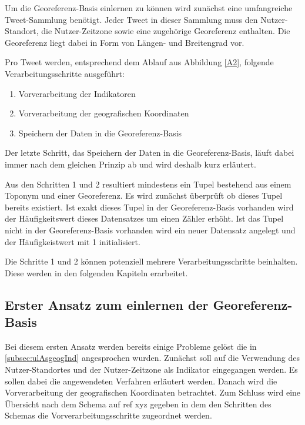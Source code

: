 						Um die Georeferenz-Basis einlernen zu können wird zunächst eine umfangreiche Tweet-Sammlung benötigt.
						Jeder Tweet in dieser Sammlung muss den Nutzer-Standort, die Nutzer-Zeitzone sowie eine zugehörige Georeferenz enthalten.
						Die Georeferenz liegt dabei in Form von Längen- und Breitengrad vor. 
						
						Pro Tweet werden, entsprechend dem Ablauf aus Abbildung \ref{A2}, folgende Verarbeitungsschritte ausgeführt:

						\begin{enumerate}
							\item Vorverarbeitung der Indikatoren
							\item Vorverarbeitung der geografischen Koordinaten
							\item Speichern der Daten in die Georeferenz-Basis
						\end{enumerate}

						Der letzte Schritt, das Speichern der Daten in die Georeferenz-Basis, läuft dabei immer nach dem gleichen Prinzip ab und wird deshalb kurz erläutert.
						
						Aus den Schritten 1 und 2 resultiert mindestens ein Tupel bestehend aus einem Toponym und einer Georeferenz. 
						Es wird zunächst überprüft ob dieses Tupel bereits existiert.
						Ist exakt dieses Tupel in der Georeferenz-Basis vorhanden wird der Häufigkeitswert dieses Datensatzes um einen Zähler erhöht.
						Ist das Tupel nicht in der Georeferenz-Basis vorhanden wird ein neuer Datensatz angelegt und der Häufigkeistwert mit 1 initialisiert.

						Die Schritte 1 und 2 können potenziell mehrere Verarbeitungsschritte beinhalten. 
						Diese werden in den folgenden Kapiteln erarbeitet.

				\subsection{Erster Ansatz zum einlernen der Georeferenz-Basis}

					Bei diesem ersten Ansatz werden bereits einige Probleme gelöst die in \ref{subsec:ulAsgeogInd} angesprochen wurden. 
					Zunächst soll auf die Verwendung des Nutzer-Standortes und der Nutzer-Zeitzone als Indikator eingegangen werden.
					Es sollen dabei die angewendeten Verfahren erläutert werden.
					Danach wird die Vorverarbeitung der geografischen Koordinaten betrachtet.
					Zum Schluss wird eine Übersicht nach dem Schema auf ref xyz gegeben in dem den Schritten des Schemas die Vorverarbeitungsschritte zugeordnet werden. 


